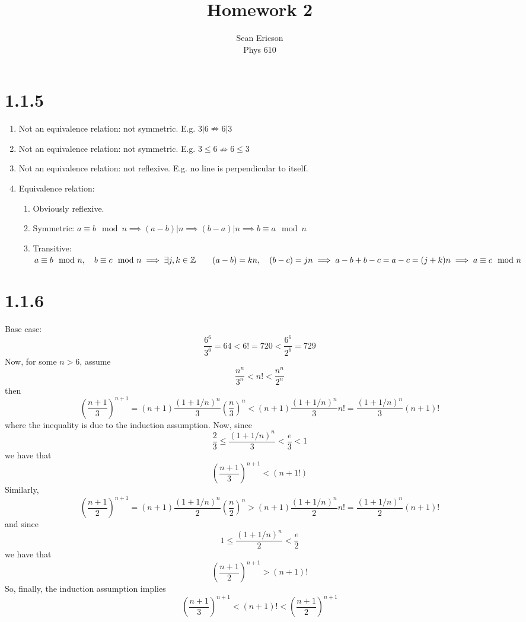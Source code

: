 \documentclass[12pt]{article}
\begin{document}
	
\title{Homework 2}
\author{Sean Ericson \\ Phys 610}
\maketitle

\section*{1.1.5}
\begin{enumerate}[label=(\alph*)]
    \item Not an equivalence relation: not symmetric. E.g. $3|6 \nRightarrow 6|3$
    \item Not an equivalence relation: not symmetric. E.g. $3\leq 6 \nRightarrow 6\leq 3$
    \item Not an equivalence relation: not reflexive. E.g. no line is perpendicular to itself.
    \item Equivalence relation:
    \begin{enumerate}
        \item Obviously reflexive.
        \item Symmetric: $a \equiv b \mod n \implies (a-b)|n \implies (b-a)|n \implies b \equiv a \mod n$
        \item Transitive: $a \equiv b \mod n, \quad b \equiv c \mod n \\ \implies \exists j,k \in \mathbb{Z} \qquad (a-b)=kn, \quad (b-c)=jn \\ \implies a-b+b-c = a-c = (j+k)n \implies a\equiv c \mod n$
    \end{enumerate}
\end{enumerate}


\section*{1.1.6}
Base case:
\[ \frac{6^6}{3^6} = 64 < 6! = 720 < \frac{6^6}{2^6} = 729  \]
Now, for some $n>6$, assume
\[ \frac{n^n}{3^n} < n! < \frac{n^n}{2^n} \]
then
\[ \left(\frac{n+1}{3}\right)^{n+1} = (n+1)\frac{(1 + 1/n)^n}{3}\left(\frac{n}{3}\right)^n < (n+1)\frac{(1 + 1/n)^n}{3}n! = \frac{(1 + 1/n)^n}{3}(n+1)! \]
where the inequality is due to the induction assumption. Now, since 
\[ \frac{2}{3} \leq \frac{(1 + 1/n)^n}{3} < \frac{e}{3} < 1 \]
we have that
\[ \left(\frac{n+1}{3}\right)^{n+1} < (n+1!) \]
Similarly,
\[ \left(\frac{n+1}{2}\right)^{n+1} = (n+1)\frac{(1 + 1/n)^n}{2}\left(\frac{n}{2}\right)^n > (n+1)\frac{(1 + 1/n)^n}{2}n! = \frac{(1 + 1/n)^n}{2}(n+1)! \]
and since
\[ 1 \leq \frac{(1 + 1/n)^n}{2} < \frac{e}{2} \]
we have that
\[ \left(\frac{n+1}{2}\right)^{n+1} > (n+1)! \]
So, finally, the induction assumption implies
\[ \left(\frac{n+1}{3}\right)^{n+1} < (n+1)! < \left(\frac{n+1}{2}\right)^{n+1} \]
\end{document}
